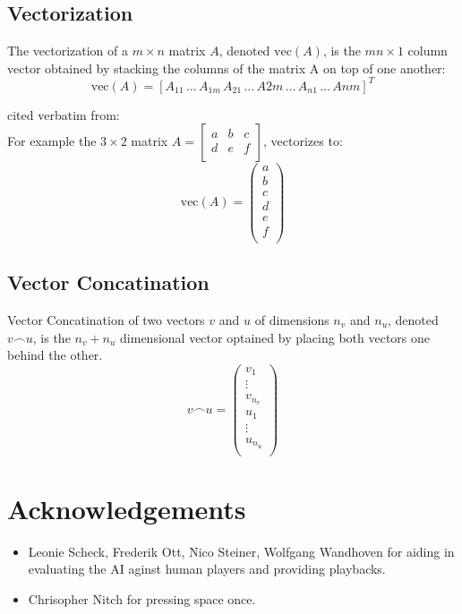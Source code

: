 \documentclass[12pt]{article}
\begin{document}
\subsection{Vectorization}  \label{sec:ref:vectorization}
The vectorization of a \(m \times n\) matrix \(A\), denoted \(\text{vec}(A)\), is the \(mn \times 1\) column vector obtained by stacking the columns of the matrix A on top of one another: 
\begin{equation}\label{eq:ref:vectorization}
\text{vec}(A) = \left[
A_{11}\,\dots\,A_{1m}\,A_{21}\,\dots \,A{2m}\,\dots\,A_{n1}\,\dots\,A{nm}
\right]^T
\end{equation}

cited verbatim from:\cite{vectorization_2021}\\
For example the \(3\times 2\) matrix \(A=\left[
\begin{matrix}
a & b & c\\
d & e & f\\
\end{matrix}
\right]\), vectorizes to:
\[
\text{vec}(A) = \left(
\begin{matrix}
a\\
b\\
c\\
d\\
e\\
f\\
\end{matrix}
\right)
\]
\subsection{Vector Concatination}
Vector Concatination of two vectors \(v\) and \(u\) of dimensions \(n_v\) and  \(n_u\), denoted \(v\frown u\), is the \(n_v + n_u\) dimensional vector optained by placing both vectors one behind the other.
\begin{equation} \label{eq:ref:vecConcatination}
v\frown u = \left(
\begin{matrix}
v_1\\
\vdots\\
v_{n_v}\\
u_1\\
\vdots\\
u_{n_u}\\
\end{matrix}
\right)
\end{equation}




\section*{Acknowledgements}
\begin{itemize}
\item Leonie Scheck, Frederik Ott, Nico Steiner, Wolfgang Wandhoven for aiding in evaluating the AI aginst human players and providing playbacks.
\item Chrisopher Nitch for pressing space once.
\end{itemize}
\end{document}
